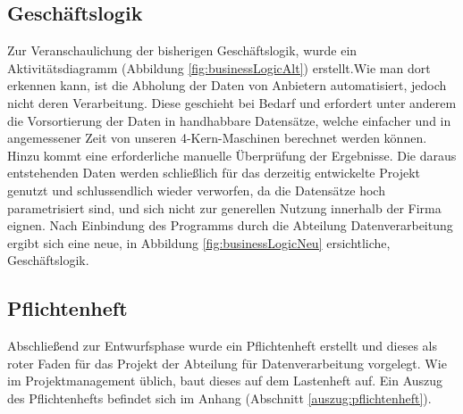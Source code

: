 \subsection{Geschäftslogik}
Zur Veranschaulichung der bisherigen Geschäftslogik, wurde ein Aktivitätsdiagramm (Abbildung \ref{fig:businessLogicAlt})
erstellt.Wie man dort erkennen kann, ist die Abholung der Daten von Anbietern automatisiert, jedoch nicht deren Verarbeitung.
Diese geschieht bei Bedarf und erfordert unter anderem die Vorsortierung der Daten in handhabbare Datensätze, welche einfacher und in angemessener Zeit von unseren 4-Kern-Maschinen
berechnet werden können. Hinzu kommt eine erforderliche manuelle Überprüfung
der Ergebnisse. Die daraus entstehenden Daten werden schließlich für das derzeitig entwickelte Projekt
genutzt und schlussendlich wieder verworfen, da die Datensätze hoch parametrisiert sind, und sich nicht zur generellen Nutzung innerhalb der Firma eignen. Nach Einbindung des Programms durch die Abteilung Datenverarbeitung ergibt sich eine neue, in Abbildung \ref{fig:businessLogicNeu} ersichtliche, Geschäftslogik.\par



\subsection{Pflichtenheft}
Abschließend zur Entwurfsphase wurde ein Pflichtenheft erstellt und dieses als
roter Faden für das Projekt der Abteilung für Datenverarbeitung vorgelegt. Wie im
Projektmanagement üblich, baut dieses auf dem Lastenheft auf.
Ein Auszug des Pflichtenhefts befindet sich im Anhang (Abschnitt \ref{auszug:pflichtenheft}).
